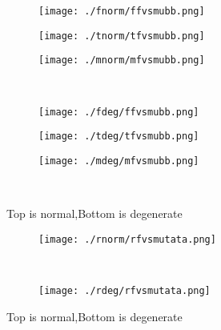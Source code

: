 \documentclass[aps,floats,floatfix,nofootinbib]{revtex4-1}
\begin{document}
\begin{center}
\begin{figure}
\begin{subfigure}{0.3\textwidth}
\texttt{[image: ./fnorm/ffvsmubb.png]}
\label{}
\end{subfigure}
\begin{subfigure}{0.3\textwidth}
\texttt{[image: ./tnorm/tfvsmubb.png]}
\label{}
\end{subfigure}
\begin{subfigure}{0.3\textwidth}
\texttt{[image: ./mnorm/mfvsmubb.png]}
\label{}
\end{subfigure}\\
\begin{subfigure}{0.3\textwidth}
\texttt{[image: ./fdeg/ffvsmubb.png]}
\label{}
\end{subfigure}
\begin{subfigure}{0.3\textwidth}
\texttt{[image: ./tdeg/tfvsmubb.png]}
\label{}
\end{subfigure}
\begin{subfigure}{0.3\textwidth}
\texttt{[image: ./mdeg/mfvsmubb.png]}
\label{}
\end{subfigure}\\
\caption{Top is normal,Bottom is degenerate}
\end{figure}
\end{center}

\begin{center}
\begin{figure}
\begin{subfigure}{0.95\textwidth}
\texttt{[image: ./rnorm/rfvsmutata.png]}
\label{}
\end{subfigure}\\
\begin{subfigure}{0.95\textwidth}
\texttt{[image: ./rdeg/rfvsmutata.png]}
\label{}
\end{subfigure}
\caption{Top is normal,Bottom is degenerate}
\end{figure}
\end{center}
\end{document}
